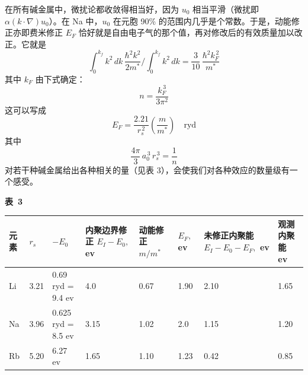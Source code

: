 在所有碱金属中，微扰论都收敛得相当好，因为 $u_0$ 相当平滑（微扰即 $\alpha(k\cdot\nabla)u_0$）。在 Na 中，$u_0$ 在元胞 90\% 的范围内几乎是个常数。于是，动能修正亦即费米修正 $E_F$ 恰好就是自由电子气的那个值，再对修改后的有效质量加以改正。它就是
\begin{equation*}
\int_0^{k_f} k^2\,dk\,\frac{\hbar^2 k^2}{2m^*}\Bigg/\int_0^{k_f} k^2\,dk=\frac{3}{10}\,\frac{\hbar^2 k_F^{\,2}}{m^*}
\end{equation*}
其中 $k_F$ 由下式确定：
\begin{equation*}
n=\frac{k_F^{\,3}}{3\pi^2}
\end{equation*}
这可以写成
\begin{equation*}
E_F=\frac{2.21}{r_s^{\,2}}\left(\frac{m}{m^*}\right)\quad\mathrm{ryd}
\end{equation*}
其中
\begin{equation*}
\frac{4\pi}{3}\,a_0^{\,3}\,r_s^{\,3}=\frac{1}{n}
\end{equation*}
对若干种碱金属给出各种相关的量（见表 3），会使我们对各种效应的数量级有一个感受。


\begin{table}[H]
\centering
{\bfseries 表~3}\\[6pt]
\small
\setlength{\tabcolsep}{4.5pt}
\renewcommand{\arraystretch}{1.25}
\begin{tabular}{@{}llllllll@{}}
\toprule
元素 & $r_s$ & $-E_0$ & \shortstack{内聚边界修正\\$E_I-E_0$\ensuremath{,} ev}
 & \shortstack{动能修正\\$m/m^*$} & $E_F$\ensuremath{,} ev
 & \shortstack{未修正内聚能\\$E_I-E_0-E_F$\ensuremath{,} ev}
 & \shortstack{观测内聚能\\ev}\\
\midrule
Li & 3.21 & \shortstack[r]{0.69 ryd =\\9.4 ev} & 4.0 & 0.67 & 1.90 & 2.10 & 1.65\\
Na & 3.96 & \shortstack[r]{0.625 ryd =\\8.5 ev} & 3.15 & 1.02 & 2.0 & 1.15 & 1.20\\
Rb & 5.20 & 6.27 ev & 1.65 & 1.10 & 1.23 & 0.42 & 0.85\\
\bottomrule
\end{tabular}
\end{table}

